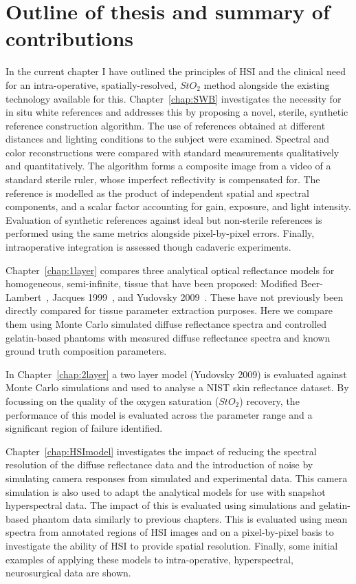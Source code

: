 \section{Outline of thesis and summary of contributions}\label{sec:thesisoutline}
In the current chapter I have outlined the principles of HSI and the clinical need for an intra-operative, spatially-resolved, $StO_2$ method alongside the existing technology available for this. 
Chapter~\ref{chap:SWB} investigates the necessity for in situ white references and addresses this by proposing a novel, sterile, synthetic reference construction algorithm. The use of references obtained at different distances and lighting conditions to the subject were examined. Spectral and color reconstructions were compared with standard measurements qualitatively and quantitatively. %
The algorithm forms a composite image from a video of a standard sterile ruler, whose imperfect reflectivity is compensated for. The reference is modelled as the product of independent spatial and spectral components, and a scalar factor accounting for gain, exposure, and light intensity. Evaluation of synthetic references against ideal but non-sterile references is performed using the same metrics alongside pixel-by-pixel errors. Finally, intraoperative integration is assessed though cadaveric experiments.

Chapter~\ref{chap:1layer} compares three analytical optical reflectance models for homogeneous, semi-infinite, tissue that have been proposed: Modified Beer-Lambert~\citep{Clancy2015}, Jacques 1999~\citep{Jacques1999}, and Yudovsky 2009~\citep{Yudovsky2009}. These have not previously been directly compared for tissue parameter extraction purposes. Here we compare them using Monte Carlo simulated diffuse reflectance spectra and controlled gelatin-based phantoms with measured diffuse reflectance spectra and known ground truth composition parameters. 

In Chapter~\ref{chap:2layer} a two layer model (Yudovsky 2009) is evaluated against Monte Carlo simulations and used to analyse a NIST skin reflectance dataset. By focussing on the quality of the oxygen saturation ($StO_2$) recovery, the performance of this model is evaluated across the parameter range and a significant region of failure identified. 

Chapter~\ref{chap:HSImodel} investigates the impact of reducing the spectral resolution of the diffuse reflectance data and the introduction of noise by simulating camera responses from simulated and experimental data. This camera simulation is also used to adapt the analytical models for use with snapshot hyperspectral data. The impact of this is evaluated using simulations and gelatin-based phantom data similarly to previous chapters. This is evaluated using mean spectra from annotated regions of HSI images and on a pixel-by-pixel basis to investigate the ability of HSI to provide spatial resolution. Finally, some initial examples of applying these models to intra-operative, hyperspectral, neurosurgical data are shown. 
